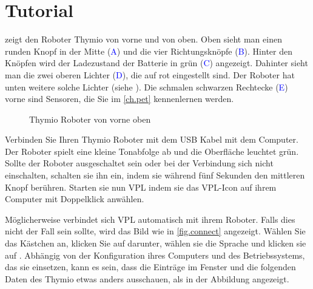\part{Tutorial}

\label{ch.intro}


 zeigt den Roboter Thymio von vorne und von oben. Oben sieht man einen runden Knopf in der Mitte (\textcolor{blue}{A}) und die vier Richtungsknöpfe (\textcolor{blue}{B}). Hinter den Knöpfen wird der Ladezustand der Batterie in grün (\textcolor{blue}{C}) angezeigt. Dahinter sieht man die zwei oberen Lichter (\textcolor{blue}{D}), die auf rot eingestellt sind. Der Roboter hat unten weitere solche Lichter (siehe ). Die schmalen schwarzen Rechtecke (\textcolor{blue}{E}) vorne sind Sensoren, die Sie im \cref{ch.pet} kennenlernen werden. 

\begin{figure}[h]
\begin{center}
\caption{Thymio Roboter von vorne oben}\label{fig.front}
\end{center}
\end{figure}


Verbinden Sie Ihren Thymio Roboter mit dem USB Kabel mit dem Computer. Der
Roboter spielt eine kleine Tonabfolge ab und die Oberfläche leuchtet grün. Sollte der Roboter ausgeschaltet sein oder bei der Verbindung sich nicht einschalten, schalten sie ihn ein, indem sie während fünf Sekunden
den mittleren Knopf berühren. Starten sie nun VPL indem sie das VPL-Icon  auf ihrem Computer mit Doppelklick anwählen.


Möglicherweise verbindet sich VPL automatisch mit ihrem Roboter. Falls dies nicht der Fall sein sollte, wird das Bild wie in \cref{fig.connect} angezeigt. Wählen Sie das Kästchen  an, klicken Sie auf  darunter, wählen sie die Sprache und klicken sie auf . Abhängig von der Konfiguration ihres Computers und des Betriebssystems, das sie einsetzen, kann es sein, dass die Einträge im Fenster und die folgenden Daten des Thymio etwas anders ausschauen, als in der Abbildung angezeigt.

